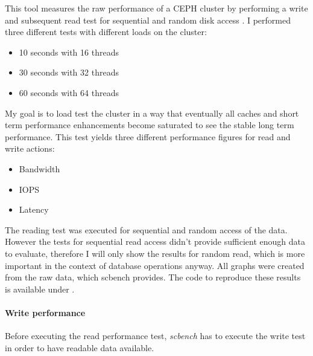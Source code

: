 \documentclass[titlepage, a4paper, 11pt]{scrartcl}
\begin{document}
            This tool measures the raw performance of a CEPH cluster by performing a write and subsequent read test for sequential and random disk access \cite{cephperformancebenchmark}. I performed three different tests with different loads on the cluster:

            \begin{itemize}
                \item 10 seconds with 16 threads
                \item 30 seconds with 32 threads
                \item 60 seconds with 64 threads
            \end{itemize}

            My goal is to load test the cluster in a way that eventually all caches and short term performance enhancements become saturated to see the stable long term performance. This test yields three different performance figures for read and write actions:

            \begin{itemize}
                \item Bandwidth
                \item IOPS
                \item Latency
            \end{itemize}

            The reading test was executed for sequential and random access of the data. However the tests for sequential read access didn't provide sufficient enough data to evaluate, therefore I will only show the results for random read, which is more important in the context of database operations anyway.
            All graphs were created from the raw data, which scbench provides. The code to reproduce these results is available under \cite{ghceph}.

            \paragraph{Write performance}

                Before executing the read performance test, \textit{scbench} has to execute the write test in order to have readable data available.
\end{document}
